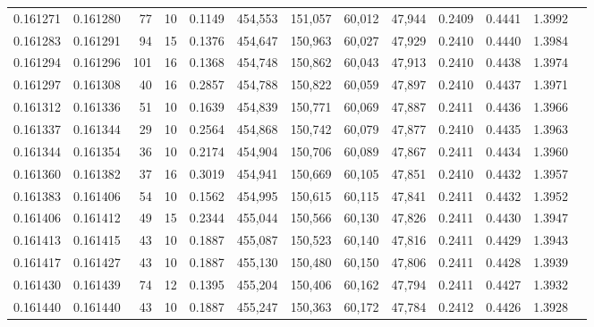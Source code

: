 \begin{tabular}{rrrrrrrrrrrrr}
0.161271 & 0.161280 &    77 &  10 &                                     0.1149 & 454,553 & 151,057 &  60,012 &  47,944 & 0.2409 & 0.4441 & 1.3992 \\
0.161283 & 0.161291 &    94 &  15 &                                     0.1376 & 454,647 & 150,963 &  60,027 &  47,929 & 0.2410 & 0.4440 & 1.3984 \\
0.161294 & 0.161296 &   101 &  16 &                                     0.1368 & 454,748 & 150,862 &  60,043 &  47,913 & 0.2410 & 0.4438 & 1.3974 \\
0.161297 & 0.161308 &    40 &  16 &                                     0.2857 & 454,788 & 150,822 &  60,059 &  47,897 & 0.2410 & 0.4437 & 1.3971 \\
0.161312 & 0.161336 &    51 &  10 &                                     0.1639 & 454,839 & 150,771 &  60,069 &  47,887 & 0.2411 & 0.4436 & 1.3966 \\
0.161337 & 0.161344 &    29 &  10 &                                     0.2564 & 454,868 & 150,742 &  60,079 &  47,877 & 0.2410 & 0.4435 & 1.3963 \\
0.161344 & 0.161354 &    36 &  10 &                                     0.2174 & 454,904 & 150,706 &  60,089 &  47,867 & 0.2411 & 0.4434 & 1.3960 \\
0.161360 & 0.161382 &    37 &  16 &                                     0.3019 & 454,941 & 150,669 &  60,105 &  47,851 & 0.2410 & 0.4432 & 1.3957 \\
0.161383 & 0.161406 &    54 &  10 &                                     0.1562 & 454,995 & 150,615 &  60,115 &  47,841 & 0.2411 & 0.4432 & 1.3952 \\
0.161406 & 0.161412 &    49 &  15 &                                     0.2344 & 455,044 & 150,566 &  60,130 &  47,826 & 0.2411 & 0.4430 & 1.3947 \\
0.161413 & 0.161415 &    43 &  10 &                                     0.1887 & 455,087 & 150,523 &  60,140 &  47,816 & 0.2411 & 0.4429 & 1.3943 \\
0.161417 & 0.161427 &    43 &  10 &                                     0.1887 & 455,130 & 150,480 &  60,150 &  47,806 & 0.2411 & 0.4428 & 1.3939 \\
0.161430 & 0.161439 &    74 &  12 &                                     0.1395 & 455,204 & 150,406 &  60,162 &  47,794 & 0.2411 & 0.4427 & 1.3932 \\
0.161440 & 0.161440 &    43 &  10 &                                     0.1887 & 455,247 & 150,363 &  60,172 &  47,784 & 0.2412 & 0.4426 & 1.3928 \\

\end{tabular}
